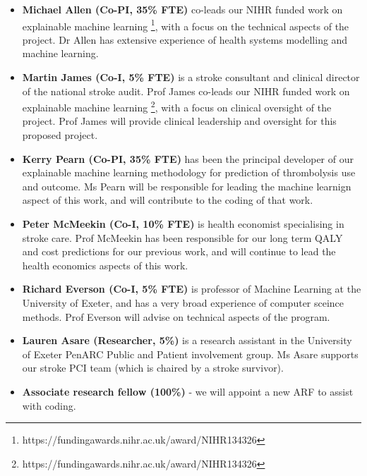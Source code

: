 \begin{itemize}

    \item \textbf{Michael Allen (Co-PI, 35\% FTE)} co-leads our NIHR funded work on explainable machine learning \footnote{https://fundingawards.nihr.ac.uk/award/NIHR134326}, with a focus on the technical aspects of the project. Dr Allen has extensive experience of health systems modelling and machine learning.

    \item \textbf{Martin James (Co-I, 5\% FTE)} is a stroke consultant and clinical director of the national stroke audit. Prof James co-leads our NIHR funded work on explainable machine learning \footnote{https://fundingawards.nihr.ac.uk/award/NIHR134326}, with a focus on clinical oversight of the project. Prof James will provide clinical leadership and oversight for this proposed project.

    \item \textbf{Kerry Pearn (Co-PI, 35\% FTE)} has been the principal developer of our explainable machine learning methodology for prediction of thrombolysis use and outcome. Ms Pearn will be responsible for leading the machine learnign aspect of this work, and will contribute to the coding of that work.

    \item \textbf{Peter McMeekin (Co-I, 10\% FTE)} is health economist specialising in stroke care. Prof McMeekin has been responsible for our long term QALY and cost predictions for our previous work, and will continue to lead the health economics aspects of this work.

    \item \textbf{Richard Everson (Co-I, 5\% FTE)} is professor of Machine Learning at the University of Exeter, and has a very broad experience of computer sceince methods. Prof Everson will advise on technical aspects of the program.

    \item \textbf{Lauren Asare (Researcher, 5\%)} is a research assistant in the University of Exeter PenARC Public and Patient involvement group. Ms Asare supports our stroke PCI team (which is chaired by a stroke survivor).

    \item \textbf{{Associate research fellow (100\%)}} - we will appoint a new ARF to assist with coding.

\end{itemize}

